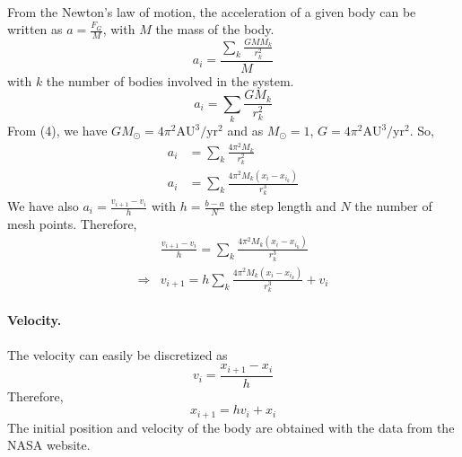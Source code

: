 \documentclass[a4paper, twoside, 11pt]{report}
\theoremstyle{theorem}
\theoremstyle{remark}
\theoremstyle{exemple}
\begin{document}
            \paragraph{} From the Newton's law of motion, the acceleration of a given body can be written as $a=\frac{F_G}{M}$, with $M$ the mass of the body. 
                \begin{equation*}
                    a_i = \frac{ \sum\limits_{k} \frac{GMM_k}{r_k^2}}{M}
                \end{equation*}
            with $k$ the number of bodies involved in the system. 
                \begin{equation*}
                    a_i = \sum\limits_{k} \frac{GM_k}{r_k^2}
                \end{equation*}
            From (4), we have $GM_{\odot} = 4\pi^2\mathrm{AU}^3/\mathrm{yr}^2$ and as $M_{\odot}=1$, $G=4\pi^2\mathrm{AU}^3/\mathrm{yr}^2$. So,
                \begin{align*}
                    a_i &= \sum\limits_{k} \frac{4\pi^2M_k}{r_k^2} \\
                    a_i &= \sum\limits_{k} \frac{4\pi^2M_k(x_i-x_{i_k})}{r_k^3} 
                    \tag{5}
                 \end{align*}
             We have also $\displaystyle a_i=\frac{v_{i+1} - v_i}{h}$ with $\displaystyle h = \frac{b-a}{N}$ the step length and $N$ the number of mesh points. Therefore, 
                \begin{align*}
                     &\frac{v_{i+1} - v_i}{h} = \sum\limits_{k}\frac{4\pi^2M_k(x_i-x_{i_k})}{r_k^3} \\
                     \Rightarrow &v_{i+1} = h\sum\limits_{k}\frac{4\pi^2M_k(x_i-x_{i_k})}{r_k^3} + v_i
                    \tag{6}
                \end{align*}
             \paragraph{Velocity.}The velocity can easily be discretized as
                \begin{equation*}
                      v_i = \frac{x_{i+1}-x_i}{h}
                  \end{equation*}
             Therefore,
                 \begin{equation*}
                    x_{i+1} = hv_i + x_i
                    \tag{7}
                \end{equation*}   
            The initial position and velocity of the body are obtained with the data from the NASA website.
\end{document}
